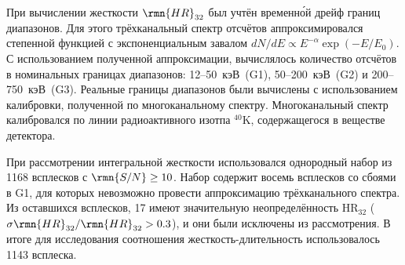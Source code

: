 При вычислении жесткости $\rmn{HR}_{32}$ был учтён временн\'{о}й дрейф границ диапазонов. 
Для этого трёхканальный спектр отсчётов аппроксимировался степенной функцией 
с экспоненциальным завалом $dN/dE \propto E^{-\alpha} \exp(-E/E_0)$. 
С использованием полученной аппроксимации, вычислялось количество отсчётов в номинальных 
границах диапазонов: 12--50~кэВ~(G1), 50--200~кэВ~(G2) и 200--750~кэВ~(G3). 
Реальные границы диапазонов были вычислены с использованием калибровки, полученной 
по многоканальному спектру.  Многоканальный спектр калибровался по линии 
радиоактивного изотпа $^{40}$K, содержащегося в веществе детектора.

При рассмотрении интегральной жесткости использовался однородный набор из 1168 
всплесков с $\rmn{S/N} \geq 10$. Набор содержит восемь всплесков со сбоями в G1, 
для которых невозможно провести аппроксимацию трёхканального спектра. 
Из оставшихся всплесков, 17 имеют значительную неопределённость HR$_{32}$ 
($\sigma\rmn{HR}_{32}/\rmn{HR}_{32} >0.3$), и они были исключены из рассмотрения. 
В итоге для исследования соотношения жесткость-длительность использовалось 1143 всплеска.

